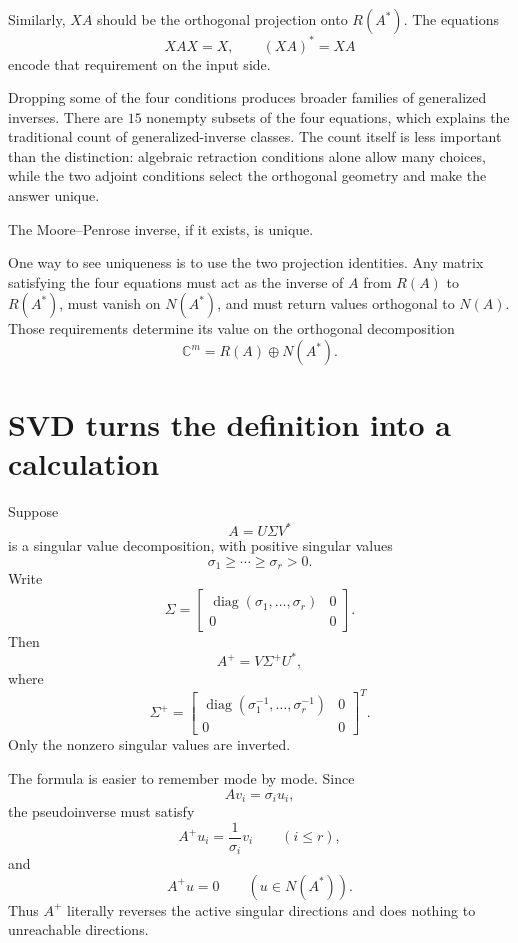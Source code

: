 Similarly, \(XA\) should be the orthogonal projection onto \(R(A^*)\).  The equations
\[
  XAX=X,
  \qquad
  (XA)^*=XA
\]
encode that requirement on the input side.

Dropping some of the four conditions produces broader families of generalized inverses.  There are \(15\) nonempty subsets of the four equations, which explains the traditional count of generalized-inverse classes.  The count itself is less important than the distinction: algebraic retraction conditions alone allow many choices, while the two adjoint conditions select the orthogonal geometry and make the answer unique.

\begin{proposition}
The Moore--Penrose inverse, if it exists, is unique.
\end{proposition}

One way to see uniqueness is to use the two projection identities.  Any matrix satisfying the four equations must act as the inverse of \(A\) from \(R(A)\) to \(R(A^*)\), must vanish on \(N(A^*)\), and must return values orthogonal to \(N(A)\).  Those requirements determine its value on the orthogonal decomposition
\[
  \mathbb C^m=R(A)\oplus N(A^*).
\]

\section{SVD turns the definition into a calculation}

Suppose
\[
  A=U\Sigma V^*
\]
is a singular value decomposition, with positive singular values
\[
  \sigma_1\ge\cdots\ge\sigma_r>0.
\]
Write
\[
  \Sigma=
  \begin{bmatrix}
    \operatorname{diag}(\sigma_1,\ldots,\sigma_r)&0\\
    0&0
  \end{bmatrix}.
\]
Then
\[
  A^+=V\Sigma^+U^*,
\]
where
\[
  \Sigma^+=
  \begin{bmatrix}
    \operatorname{diag}(\sigma_1^{-1},\ldots,\sigma_r^{-1})&0\\
    0&0
  \end{bmatrix}^{\!T}.
\]
Only the nonzero singular values are inverted.

The formula is easier to remember mode by mode.  Since
\[
  Av_i=\sigma_i u_i,
\]
the pseudoinverse must satisfy
\[
  A^+u_i=\frac1{\sigma_i}v_i
  \qquad(i\le r),
\]
and
\[
  A^+u=0
  \qquad(u\in N(A^*)).
\]
Thus \(A^+\) literally reverses the active singular directions and does nothing to unreachable directions.

